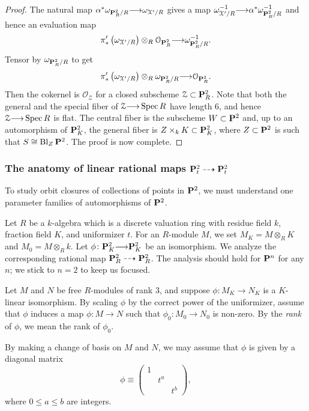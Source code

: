 \documentclass[12pt,reqno]{amsart}
\renewcommand{\k}{k}
\DeclareMathOperator{\Bl}{Bl}
\renewcommand{\to}{{\longrightarrow}}
\numberwithin{equation}{section}
\renewcommand{\O}{\mathcal O}
\begin{document}
\begin{proof}
  The natural map $\alpha^* \omega_{\P^2_R/R} \to \omega_{\mathcal X'/R}$ gives a map $\omega^{-1}_{\mathcal X'/R} \to \alpha^* \omega^{-1}_{\P^2_R/R}$ and hence an evaluation map
  \[ \pi'_* \left(\omega_{\mathcal X'/R}\right) \otimes_R \O_{\P^2_R} \to \omega_{\P^2_R/R}^{-1}.\]
  Tensor by $\omega_{\P^2_R/R}$ to get
  \[ \pi'_* \left(\omega_{\mathcal X'/R}\right) \otimes_R \omega_{\P^2_R/R} \to \O_{\P^2_R}.\]
  Then the cokernel is $\O_{\mathcal Z}$ for a closed subscheme $\mathcal Z \subset \P^2_R$.
  Note that both the general and the special fiber of $\mathcal Z \to \spec R$ have length 6, and hence $\mathcal Z \to \spec R$ is flat.
  The central fiber is the subscheme $W \subset \P^2$ and, up to an automorphism of $\P^2_K$, the general fiber is $Z \times_k K \subset \P^2_K$, where $Z \subset \P^2$ is such that $S \cong \Bl_Z \P^2$.
  The proof is now complete.
\end{proof}

\subsubsection{The anatomy of linear rational maps $\P_t^2 \dashrightarrow \P_t^2$}\label{sec:ratmap}
To study orbit closures of collections of points in $\P^2$, we must understand one parameter families of automorphisms of $\P^2$.

Let $R$ be a $\k$-algebra which is a discrete valuation ring with residue field $\k$, fraction field $K$, and uniformizer $t$.
For an $R$-module $M$, we set $M_K = M \otimes_R K$ and $M_0 = M \otimes_R \k$.
Let $\phi \colon \P^2_K \to \P^2_K$ be an isomorphism.
We analyze the corresponding rational map $\P^2_R \dashrightarrow \P^2_R$.
The analysis should hold for $\P^n$ for any $n$; we stick to $n = 2$ to keep us focused.

Let $M$ and $N$ be free $R$-modules of rank 3, and suppose $\phi \colon M_K \to N_K$ is a $K$-linear isomorphism.
By scaling $\phi$ by the correct power of the uniformizer, assume that $\phi$ induces a map $\phi \colon M \to N$ such that $\phi_0 \colon M_0 \to N_0$ is non-zero.
By the \emph{rank} of $\phi$, we mean the rank of $\phi_0$.

By making a change of basis on $M$ and $N$, we may assume that $\phi$ is given by a diagonal matrix
\[
  \phi \equiv
  \begin{pmatrix}
    1 & & \\
     & t^a & \\
    & & t^b
  \end{pmatrix},
\]
where $0 \leq a \leq b$ are integers.
\end{document}
